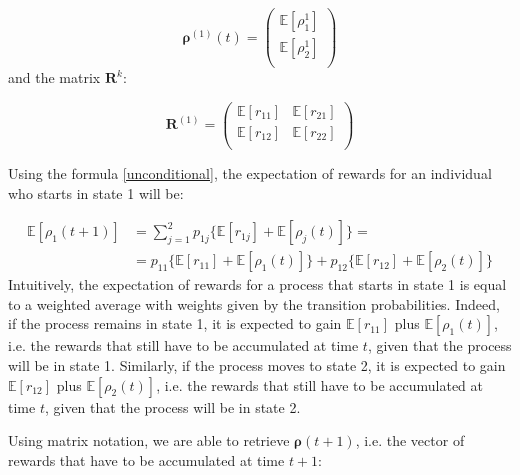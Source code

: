 \documentclass[\main/main.tex]{subfiles}
\begin{document}
\begin{equation}
 \bm{\rho}^{(1)} (t)=
\begin{pmatrix}
\mathds{E}[\rho^1_1]\\
\mathds{E}[\rho^1_2]\\
\end{pmatrix}
\end{equation}
and the matrix $\mathbf{R}^k$:

\begin{equation}
 \bm{R}^{(1)} =
\begin{pmatrix}
\mathds{E}[r_{11}] & \mathds{E}[r_{21}]\\
\mathds{E}[r_{12}] & \mathds{E}[r_{22}]\\
\end{pmatrix}
\end{equation}

\noindent Using the formula \ref{unconditional}, the expectation of rewards for an individual who starts in state 1 will be:

\begin{equation}
\begin{split}
  \mathds{E}[\rho_1(t+1)] &= \sum_{j=1}^2 p_{1j}\{ \mathds{E}[r_{1j}] + \mathds{E}[\rho_j(t)] \}=  \\
  &= p_{11}\{ \mathds{E}[r_{11}] + \mathds{E}[\rho_1(t)] \} + p_{12}\{ \mathds{E}[r_{12}] + \mathds{E}[\rho_2(t)] \}
\end{split}
\end{equation}
Intuitively, the expectation of rewards for a process that starts in state 1 is equal to a weighted average with weights given by the transition probabilities. Indeed, if the process remains in state 1, it is expected to gain $\mathds{E}[r_{11}]$ plus $\mathds{E}[\rho_1(t)] $, i.e. the rewards that still have to be accumulated at time $t$, given that the process will be in state 1. Similarly, if the process moves to state 2, it is expected to gain $\mathds{E}[r_{12}]$ plus $\mathds{E}[\rho_2(t)] $, i.e. the rewards that still have to be accumulated at time $t$, given that the process will be in state 2.

Using matrix notation, we are able to retrieve $\bm{\rho}(t+1)$, i.e. the vector of rewards that have to be accumulated at time $t+1$:
\end{document}
